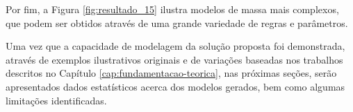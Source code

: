 \begin{figure}[h!]
	\centering
	\captionsetup{width=15cm}
	{}	
\end{figure}

\newpage

Por fim, a Figura \ref{fig:resultado_15} ilustra modelos de massa mais complexos, que podem ser obtidos através de uma grande variedade de regras e parâmetros.

\begin{figure}[h!]
	\centering
	\captionsetup{width=15cm}
	{}	
\end{figure}

\vspace{1cm}

Uma vez que a capacidade de modelagem da solução proposta foi demonstrada, através de exemplos ilustrativos originais e de variações baseadas nos trabalhos descritos no Capítulo \ref{cap:fundamentacao-teorica}, nas próximas seções, serão apresentados dados estatísticos acerca dos modelos gerados, bem como algumas limitações identificadas.

